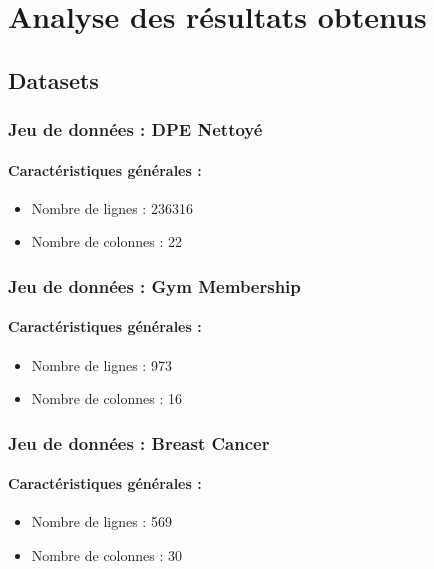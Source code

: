 \documentclass[10pt,french]{report}
\begin{document}
    \chapter{Analyse des résultats obtenus}

    \section{Datasets}

    \subsection{Jeu de données : DPE Nettoyé}
    
    \subsubsection{Caractéristiques générales :}
    \begin{itemize}
        \item Nombre de lignes : 236316
        \item Nombre de colonnes : 22
    \end{itemize}

    \subsection{Jeu de données : Gym Membership}
    
    \subsubsection{Caractéristiques générales :}
    \begin{itemize}
        \item Nombre de lignes : 973
        \item Nombre de colonnes : 16
    \end{itemize}

    \subsection{Jeu de données : Breast Cancer}
    
    \subsubsection{Caractéristiques générales :}
    \begin{itemize}
        \item Nombre de lignes : 569
        \item Nombre de colonnes : 30
    \end{itemize}
\end{document}
